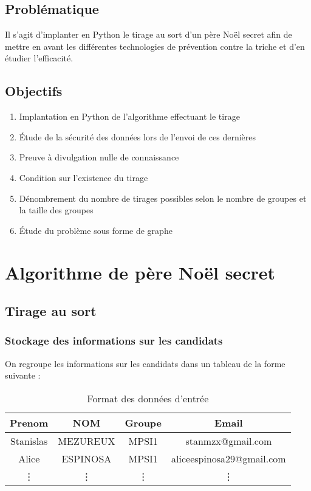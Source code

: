 \documentclass[a4paper, 12pt]{report}
\begin{document}
    \section{Problématique}
        Il s’agit d’implanter en Python le tirage au sort d’un père Noël secret afin de mettre en avant les différentes technologies de prévention contre la triche et d’en étudier l’efficacité.
    \section{Objectifs}
        \begin{enumerate}
            \item Implantation en Python de l’algorithme effectuant le tirage
            \item Étude de la sécurité des données lors de l’envoi de ces dernières
            \item Preuve à divulgation nulle de connaissance
            \item Condition sur l'existence du tirage
            \item Dénombrement du nombre de tirages possibles selon le nombre de groupes et la taille des groupes
            \item Étude du problème sous forme de graphe
        \end{enumerate}
        
\chapter{Algorithme de père Noël secret}
    \section{Tirage au sort}
        \subsection{Stockage des informations sur les candidats}
            On regroupe les informations sur les candidats dans un tableau de la forme suivante :
            \begin{table}[ht]
                \centering
                \caption{Format des données d'entrée}
                \label{tab:data}
                \begin{tabular}[t]{cccc}
                    \hline
                     Prenom & NOM & Groupe & Email\\
                    \hline
                    Stanislas & MEZUREUX & MPSI1 & stanmzx@gmail.com \\
                    Alice & ESPINOSA & MPSI1 & aliceespinosa29@gmail.com \\
                    \vdots & \vdots & \vdots & \vdots \\
                    \hline
                \end{tabular}
            \end{table}
            
\end{document}
